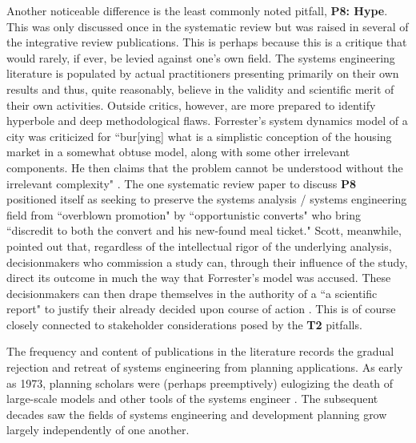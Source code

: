 Another noticeable difference is the least commonly noted pitfall, \textbf{P8: Hype}. This was only discussed once in the systematic review but was raised in several of the integrative review publications. This is perhaps because this is a critique that would rarely, if ever, be levied against one's own field. The systems engineering literature is populated by actual practitioners presenting primarily on their own results and thus, quite reasonably, believe in the validity and scientific merit of their own activities. Outside critics, however, are more prepared to identify hyperbole and deep methodological flaws. Forrester's system dynamics model of a city \cite{forresterUrbanDynamics1969} was criticized for ``bur[ying] what is a simplistic conception of the housing market in a somewhat obtuse model, along with some other irrelevant components. He then claims that the problem cannot be understood without the irrelevant complexity" \cite[\textsuperscript{(p174)}]{leejrRequiemLargeScaleModels1973}. The one systematic review paper to discuss \textbf{P8} positioned itself as seeking to preserve the systems analysis / systems engineering field from ``overblown promotion" by ``opportunistic converts" who bring ``discredit to both the convert and his new-found meal ticket." \cite[\textsuperscript{(p1-3)}]{brewerSystemsAnalysisUrban1973} Scott, meanwhile, pointed out that, regardless of the intellectual rigor of the underlying analysis, decisionmakers who commission a study can, through their influence of the study, direct its outcome in much the way that Forrester's model was accused. These decisionmakers can then drape themselves in the authority of a ``a scientific report" to justify their already decided upon course of action \cite{scottSeeingStateHow2020}. This is of course closely connected to stakeholder considerations posed by the \textbf{T2} pitfalls.


The frequency and content of publications in the literature records the gradual rejection and retreat of systems engineering from planning applications. As early as 1973, planning scholars were (perhaps preemptively) eulogizing the death of large-scale models and other tools of the systems engineer \cite{leejrRequiemLargeScaleModels1973}. The subsequent decades saw the fields of systems engineering and development planning grow largely independently of one another.

